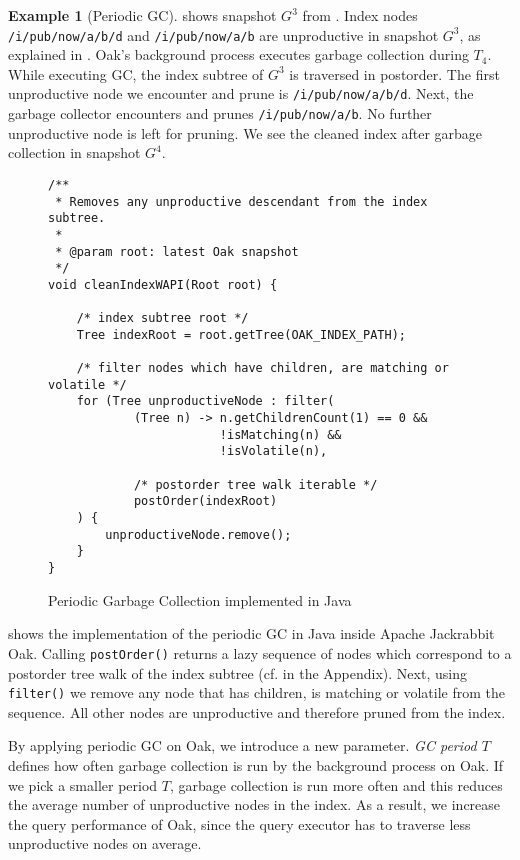 \documentclass[abstracton,12pt]{scrartcl}
\theoremstyle{definition}
\newtheorem{example}{Example}
\begin{document}
\begin{example}[Periodic GC]
   shows snapshot $G^3$ from
  . Index nodes \texttt{/i/pub/now/a/b/d}
  and \texttt{/i/pub/now/a/b} are unproductive in snapshot $G^3$, as explained
  in . Oak's background process executes garbage
  collection during $T_4$. While executing GC, the index subtree of $G^3$ is
  traversed in postorder.
  The first unproductive node we encounter and prune is
  \texttt{/i/pub/now/a/b/d}. Next, the garbage collector encounters and prunes
  \texttt{/i/pub/now/a/b}. No further unproductive node is left for pruning. We
  see the cleaned index after garbage collection in snapshot $G^4$.
\end{example}

\begin{figure}[H]
  \small
  \begin{framed}
\begin{verbatim}
/**
 * Removes any unproductive descendant from the index subtree.
 *
 * @param root: latest Oak snapshot 
 */
void cleanIndexWAPI(Root root) {

    /* index subtree root */
    Tree indexRoot = root.getTree(OAK_INDEX_PATH);

    /* filter nodes which have children, are matching or volatile */
    for (Tree unproductiveNode : filter(
            (Tree n) -> n.getChildrenCount(1) == 0 &&
                        !isMatching(n) &&
                        !isVolatile(n),

            /* postorder tree walk iterable */
            postOrder(indexRoot)
    ) {
        unproductiveNode.remove();
    }
}
\end{verbatim}
  \end{framed}
  \caption[Periodic GC implemented in Java]{Periodic Garbage Collection
    implemented in Java}
  \label{fig:java_periodic_gc}
\end{figure}

 shows the implementation of the periodic
GC in Java inside Apache Jackrabbit Oak. Calling \texttt{postOrder()} returns a
lazy sequence of nodes
which correspond to a postorder tree walk of the index subtree (cf.
 in the Appendix). Next, using \texttt{filter()} we
remove any node
that has children, is matching or volatile from the sequence. All other nodes are
unproductive and therefore pruned from the index.

By applying periodic GC on Oak, we introduce a new
parameter. \textit{GC period $T$} defines how often garbage collection is run by
the background process on Oak. If we pick a smaller
period $T$, garbage collection is run more often and this
reduces the average number of unproductive nodes in the index. As a result, we
increase the query performance of Oak,
since the query executor has to traverse less unproductive nodes on average.
\end{document}
